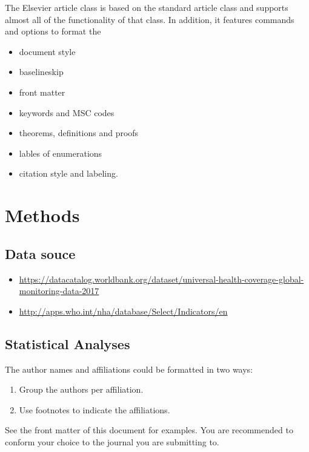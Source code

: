 \documentclass[]{elsarticle} %
\begin{document}
The Elsevier article class is based on the standard article class and
supports almost all of the functionality of that class. In addition, it
features commands and options to format the

\begin{itemize}
\item
  document style
\item
  baselineskip
\item
  front matter
\item
  keywords and MSC codes
\item
  theorems, definitions and proofs
\item
  lables of enumerations
\item
  citation style and labeling.
\end{itemize}

\hypertarget{methods}{%
\section{Methods}\label{methods}}

\hypertarget{data-souce}{%
\subsection{Data souce}\label{data-souce}}

\begin{itemize}
\item
  \url{https://datacatalog.worldbank.org/dataset/universal-health-coverage-global-monitoring-data-2017}
\item
  \url{http://apps.who.int/nha/database/Select/Indicators/en}
\end{itemize}

\hypertarget{statistical-analyses}{%
\subsection{Statistical Analyses}\label{statistical-analyses}}

The author names and affiliations could be formatted in two ways:

\begin{enumerate}
\def\labelenumi{(\arabic{enumi})}
\item
  Group the authors per affiliation.
\item
  Use footnotes to indicate the affiliations.
\end{enumerate}

See the front matter of this document for examples. You are recommended
to conform your choice to the journal you are submitting to.
\end{document}
